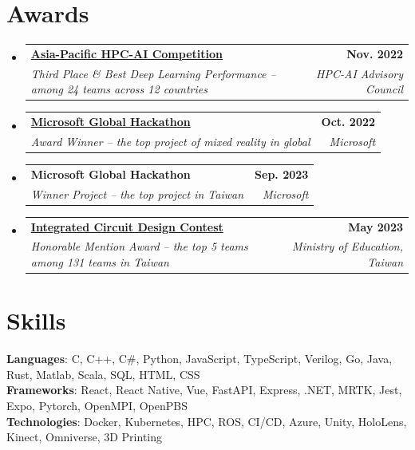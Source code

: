 \documentclass[letterpaper,11pt]{article}
\makeatletter
\newcommand{\resumeSubheading}[4]{
  \vspace{-2pt}\item
    \begin{tabular*}{1.0\textwidth}[t]{l@{\extracolsep{\fill}}r}
      \textbf{#1} & \textbf{\small #2} \\
      \textit{\small#3} & \textit{\small #4} \\
    \end{tabular*}\vspace{-7pt}
}
\newcommand{\resumeSubHeadingListStart}{\begin{itemize}[leftmargin=0.0in, label={}]}
\newcommand{\resumeSubHeadingListEnd}{\end{itemize}}
\makeatother
\begin{document}
\section{Awards}
    \resumeSubHeadingListStart
        \resumeSubheading{\href{https://nci.org.au/news-events/news/growing-skills-hpc-researchers-through-regional-competition}{Asia-Pacific HPC-AI Competition}}{Nov. 2022}{Third Place \& Best Deep Learning Performance -- among 24 teams across 12 countries}{HPC-AI Advisory Council}
        \resumeSubheading{\href{https://news.microsoft.com/zh-tw/features/microsoft-hackathon-2022/}{Microsoft Global Hackathon}}{Oct. 2022}{Award Winner -- the top project of mixed reality in global}{Microsoft}
        \resumeSubheading{Microsoft Global Hackathon}{Sep. 2023}{Winner Project -- the top project in Taiwan}{Microsoft}
        \resumeSubheading{\href{https://www.csie.ncku.edu.tw/zh-hant/news/12560}{Integrated Circuit Design Contest}}{May 2023}{Honorable Mention Award -- the top 5 teams among 131 teams in Taiwan}{Ministry of Education, Taiwan}
    \resumeSubHeadingListEnd
\vspace{-12pt}

\section{Skills}
 \begin{itemize}[leftmargin=0.0in, label={}]
    \small{\item{
     \textbf{Languages}{: C, C++, C\#, Python, JavaScript, TypeScript, Verilog, Go, Java, Rust, Matlab, Scala, SQL, HTML, CSS} \\
     \textbf{Frameworks}{: React, React Native, Vue, FastAPI, Express, .NET, MRTK, Jest, Expo, Pytorch, OpenMPI, OpenPBS} \\
     \textbf{Technologies}{: Docker, Kubernetes, HPC, ROS, CI/CD, Azure, Unity, HoloLens, Kinect, Omniverse, 3D Printing} \\
    }}
 \end{itemize}
 \vspace{-16pt}
\end{document}

